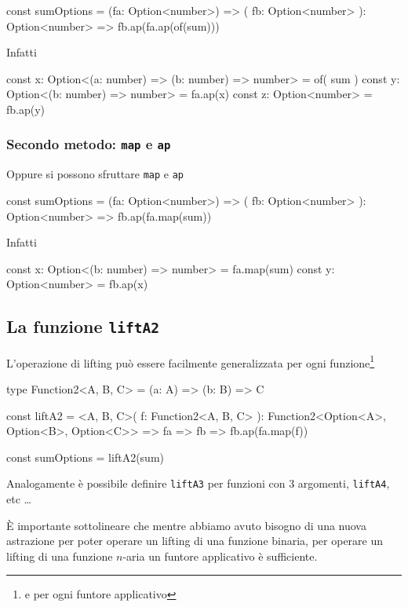 \documentclass[12pt]{article}
\theoremstyle{definition}
\newenvironment{code}
  {\vspace{0.5cm} \VerbatimEnvironment\begin{typescriptcode}}
  {\end{typescriptcode} \vspace{0.2cm}}
\begin{document}
\begin{code}
const sumOptions = (fa: Option<number>) => (
  fb: Option<number>
): Option<number> => fb.ap(fa.ap(of(sum)))
\end{code}

Infatti

\begin{code}
const x: Option<(a: number) => (b: number) => number> = of(
  sum
)
const y: Option<(b: number) => number> = fa.ap(x)
const z: Option<number> = fb.ap(y)
\end{code}

\subsubsection{Secondo metodo: \texttt{map} e \texttt{ap}}

Oppure si possono sfruttare \texttt{map} e \texttt{ap}

\begin{code}
const sumOptions = (fa: Option<number>) => (
  fb: Option<number>
): Option<number> => fb.ap(fa.map(sum))
\end{code}

Infatti

\begin{code}
const x: Option<(b: number) => number> = fa.map(sum)
const y: Option<number> = fb.ap(x)
\end{code}

\subsection{La funzione \texttt{liftA2}}

L'operazione di lifting può essere facilmente generalizzata per ogni funzione\footnote{e per ogni funtore applicativo}

\begin{code}
type Function2<A, B, C> = (a: A) => (b: B) => C

const liftA2 = <A, B, C>(
  f: Function2<A, B, C>
): Function2<Option<A>, Option<B>, Option<C>> => fa => fb =>
  fb.ap(fa.map(f))

const sumOptions = liftA2(sum)
\end{code}

Analogamente è possibile definire \texttt{liftA3} per funzioni con 3 argomenti, \texttt{liftA4}, etc \ldots

È importante sottolineare che mentre abbiamo avuto bisogno di una nuova astrazione per poter operare un lifting di una funzione binaria,
per operare un lifting di una funzione $n$-aria un funtore applicativo è sufficiente.
\end{document}
